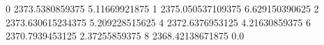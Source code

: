 0 2373.5380859375 5.11669921875
1 2375.050537109375 6.629150390625
2 2373.630615234375 5.209228515625
4 2372.6376953125 4.21630859375
6 2370.7939453125 2.37255859375
8 2368.42138671875 0.0
